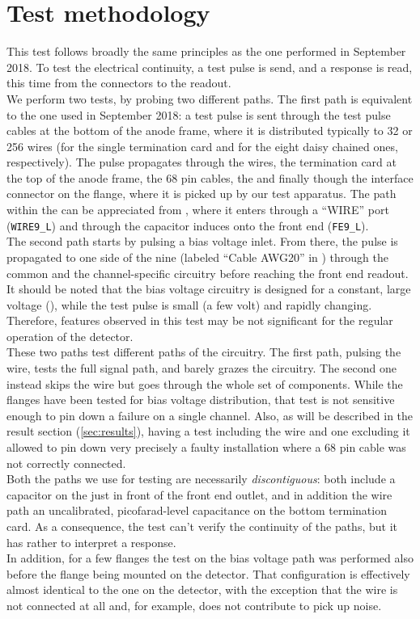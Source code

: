 \section{Test methodology}
\label{sec:methodology}

This test follows broadly the same principles as the one performed in September
2018.
To test the electrical continuity, a test pulse is send, and a response is read,
this time from the connectors to the readout.
\\
We perform two tests, by probing two different paths.
The first path is equivalent to the one used in September 2018: a test pulse is
sent through the test pulse cables at the bottom of the anode frame, where it is
distributed typically to 32 or 256 wires (for the single termination card and
for the eight daisy chained ones, respectively).
The pulse propagates through the wires, the termination card at the top of the
anode frame, the 68 pin cables, the \DBB and finally though the interface
connector on the flange, where it is picked up by our test apparatus.
The path within the \DBB can be appreciated from \cite{ICARUSDBB}, where it
enters through a ``WIRE'' port (\eg \texttt{WIRE9\_L}) and through the
 capacitor induces onto the front end (\eg \texttt{FE9\_L}).
\\
The second path starts by pulsing a bias voltage inlet.
From there, the pulse is propagated to one side of the nine \DBB (labeled
``Cable AWG20'' in \cite{ICARUSDBB}) through the common and the channel-specific
circuitry before reaching the front end readout.
It should be noted that the bias voltage circuitry is designed for a constant,
large voltage (), while the test pulse is small (a few volt) and rapidly
changing.
Therefore, features observed in this test may be not significant for the regular
operation of the detector.
\\
These two paths test different paths of the circuitry.
The first path, pulsing the wire, tests the full signal path, and barely grazes
the \DBB circuitry.
The second one instead skips the wire but goes through the whole set of \DBB
components.
While the flanges have been tested for bias voltage distribution, that test is
not sensitive enough to pin down a failure on a single channel.
Also, as will be described in the result section (\cref{sec:results}), having a
test including the wire and one excluding it allowed to pin down very precisely
a faulty installation where a 68 pin cable was not correctly connected.
\\
Both the paths we use for testing are necessarily \emph{discontiguous}: both
include a  capacitor on the \DBB just in front of the front end
outlet, and in addition the wire path an uncalibrated, picofarad-level
capacitance on the bottom termination card.
As a consequence, the test can't verify the continuity of the paths, but it has
rather to interpret a response.
\\
In addition, for a few flanges the test on the bias voltage path was performed
also before the flange being mounted on the detector.
That configuration is effectively almost identical to the one on the detector,
with the exception that the wire is not connected at all and, for example, does
not contribute to pick up noise.


